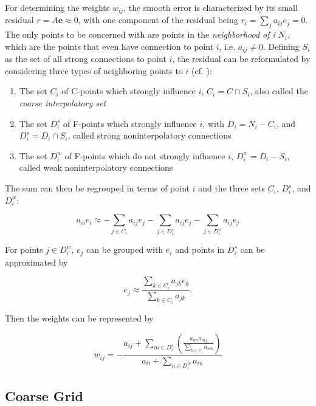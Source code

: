 For determining the weights $w_{ij}$, the smooth error is characterized by its small residual $r = A\mathbf{e} \approx 0$, with one component of the residual being $r_i = \sum_{j}{a_{ij}e_j} = 0$. The only points to be concerned with are points in the \emph{neighborhood of i} $N_i$, which are the points that even have connection to point $i$, i.e. $a_{ij} \neq 0$. Defining $S_i$ as the set of all strong connections to point $i$, the residual can be reformulated by considering three types of neighboring points to $i$ (cf. \cite{Briggs2000}):
\begin{enumerate}
	\item The set $C_i$ of C-points which strongly influence $i$, $C_i = C \cap S_i$, also called the \emph{coarse interpolatory set}
	\item The set $D_i^s$ of F-points which strongly influence $i$, with $D_i = N_i - C_i$, and $D_i^s = D_i \cap S_i$, called strong noninterpolatory connections
	\item The set $D_i^w$ of F-points which do not strongly influence $i$, $D_i^w = D_i - S_i$, called weak noninterpolatory connections
\end{enumerate}

The sum can then be regrouped in terms of point $i$ and the three sets $C_i$, $D_i^s$, and $D_i^w$:

\begin{equation}
	a_{ii}e_i \approx -\sum_{j \in C_i}{a_{ij}e_j} - \sum_{j \in D_i^s}{a_{ij}e_j} - \sum_{j \in D_i^w}{a_{ij}e_j}
\end{equation}

For points $j \in D_i^w$, $e_j$ can be grouped with $e_i$ and points in $D_i^s$ can be approximated by

\begin{equation}
	e_j \approx \frac{\displaystyle \sum_{k \in C_i}{a_{jk}e_k}}{\displaystyle \sum_{k \in C_i}{a_{jk}}}.
	\label{ej_approx}
\end{equation}

Then the weights can be represented by

\begin{equation}
	w_{ij} = - \frac{a_{ij} + \displaystyle \sum_{m \in D_i^s}{\left(\frac{a_{im}a_{mj}}{\displaystyle \sum_{k \in C_i}{a_{mk}}}\right)}}{a_{ii} + \displaystyle \sum_{n \in D_i^w}{a_{in}}}
\end{equation}

\subsection{Coarse Grid} %

